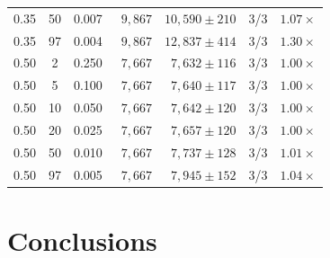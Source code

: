 \documentclass[11pt]{article}
\begin{document}
\begin{table}[h]
\begin{tabular}{ccrrrcr}
0.35 & 50 & 0.007 & $\phantom{0}9{,}867$ & $10{,}590 \pm 210$ & 3/3 & $1.07\times$ \\
0.35 & 97 & 0.004 & $\phantom{0}9{,}867$ & $12{,}837 \pm 414$ & 3/3 & $1.30\times$ \\
\midrule
\rowcolor{grokgreen!10}
0.50 &  2 & 0.250 & $\phantom{0}7{,}667$ & $\phantom{0}7{,}632 \pm 116$ & 3/3 & $1.00\times$ \\
\rowcolor{grokgreen!10}
0.50 &  5 & 0.100 & $\phantom{0}7{,}667$ & $\phantom{0}7{,}640 \pm 117$ & 3/3 & $1.00\times$ \\
\rowcolor{grokgreen!10}
0.50 & 10 & 0.050 & $\phantom{0}7{,}667$ & $\phantom{0}7{,}642 \pm 120$ & 3/3 & $1.00\times$ \\
\rowcolor{grokgreen!10}
0.50 & 20 & 0.025 & $\phantom{0}7{,}667$ & $\phantom{0}7{,}657 \pm 120$ & 3/3 & $1.00\times$ \\
\rowcolor{grokgreen!10}
0.50 & 50 & 0.010 & $\phantom{0}7{,}667$ & $\phantom{0}7{,}737 \pm 128$ & 3/3 & $1.01\times$ \\
\rowcolor{grokgreen!10}
0.50 & 97 & 0.005 & $\phantom{0}7{,}667$ & $\phantom{0}7{,}945 \pm 152$ & 3/3 & $1.04\times$ \\
\bottomrule
\end{tabular}
\end{table}


\clearpage

\section{Conclusions}
\end{document}
